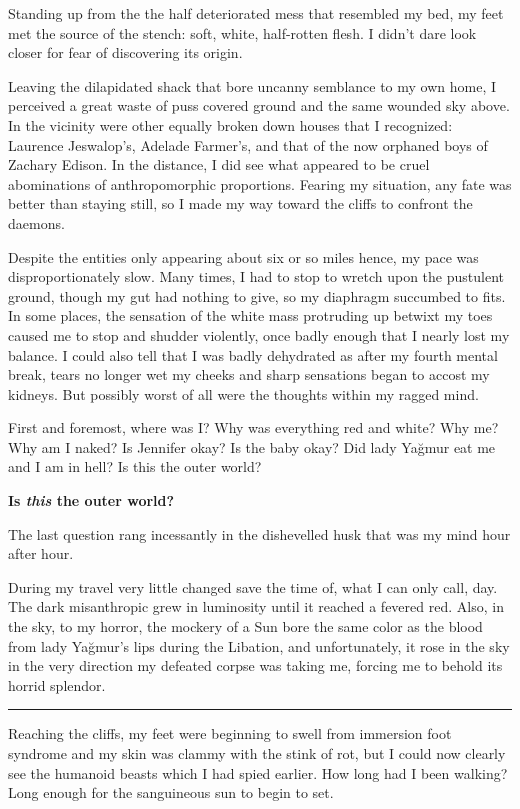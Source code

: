 \documentclass[11pt]{memoir}
\begin{document}
Standing up from the the half deteriorated mess that resembled my bed, my feet met the source of the stench: soft, white, half-rotten flesh. I didn't dare look closer for fear of discovering its origin.

Leaving the dilapidated shack that bore uncanny semblance to my own home, I perceived a great waste of puss covered ground and the same wounded sky above. In the vicinity were other equally broken down houses that I recognized: Laurence Jeswalop's, Adelade Farmer's, and that of the now orphaned boys of Zachary Edison. In the distance, I did see what appeared to be cruel abominations of anthropomorphic proportions. Fearing my situation, any fate was better than staying still, so I made my way toward the cliffs to confront the daemons.

Despite the entities only appearing about six or so miles hence, my pace was disproportionately slow. Many times, I had to stop to wretch upon the pustulent ground, though my gut had nothing to give, so my diaphragm succumbed to fits. In some places, the sensation of the white mass protruding up betwixt my toes caused me to stop and shudder violently, once badly enough that I nearly lost my balance. I could also tell that I was badly dehydrated as after my fourth mental break, tears no longer wet my cheeks and sharp sensations began to accost my kidneys. But possibly worst of all were the thoughts within my ragged mind.

First and foremost, where was I? Why was everything red and white? Why me? Why am I naked? Is Jennifer okay? Is the baby okay? Did lady Yağmur eat me and I am in hell? Is this the outer world?

\vspace{5mm}
\textbf{Is \textit{this} the outer world?}
\vspace{5mm}

The last question rang incessantly in the dishevelled husk that was my mind hour after hour.

During my travel very little changed save the time of, what I can only call, day. The dark misanthropic grew in luminosity until it reached a fevered red. Also, in the sky, to my horror, the mockery of a Sun bore the same color as the blood from lady Yağmur's lips during the Libation, and unfortunately, it rose in the sky in the very direction my defeated corpse was taking me, forcing me to behold its horrid splendor.

\noindent\rule{\textwidth}{1pt}

Reaching the cliffs, my feet were beginning to swell from immersion foot syndrome and my skin was clammy with the stink of rot, but I could now clearly see the humanoid beasts which I had spied earlier. How long had I been walking? Long enough for the sanguineous sun to begin to set.
\end{document}
